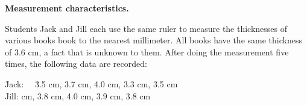 \documentclass[11pt]{article}
\newcommand{\blue}[1]{{\color{blue} #1}}
\newcommand{\ben}{\begin{enumerate}}
\newcommand{\een}{\end{enumerate}}
\begin{document}

%
%
%

\item \textbf{Measurement characteristics.}

Students Jack and Jill each use the same ruler to measure
the thicknesses of various books 
book to the nearest millimeter.  All books have the same thickness of 3.6 cm,
a fact that is unknown to them.
After doing the measurement five times, 
the following data are recorded: 
\begin{tabbing}
\qquad \=Jack: \ \ \= 3.5 cm, 3.7 cm, 4.0 cm, 3.3 cm, 3.5 cm \\
 \> Jill: cm, 3.8 cm, 4.0 cm, 3.9 cm, 3.8 cm 
\end{tabbing}
 
\end{document}
